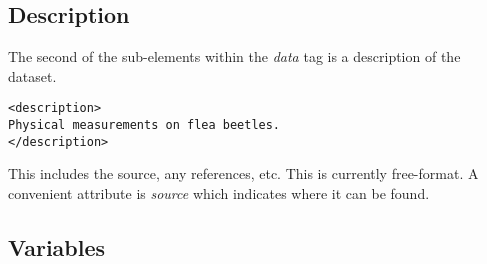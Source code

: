 \documentclass{article}
\def\strip#1>{}
\def\Escape#1{\def\next{#1}%
{\frenchspacing\expandafter\strip\meaning\next}}
\def\file#1{\HREF{#1}{\textbf{\Escape{#1}}}}
\def\XMLTag#1{\textit{#1}}
\def\XMLAttribute#1{\textsl{#1}}
\begin{document}
\begin{comment}
To differentiate between the two formats, the \XMLAttribute{type} is
used when specifying an external color map file to read.  This can be
either \texttt{xml} or \texttt{ascii}.  (See \file{ggobi.dtd})


Each entry can have an identifier attribute.  This is usually an
integer identifying the index by which one can reference this color in
records and other files.  The alternative values for the identifier
attribute are ``fg'' or ``bg''.

The identifier is really only used to override other values read from
a file.  This is due to the fact that subsequent entries without
identifiers occupy the next entry  in the color table.
In other words, the input
\begin{verbatim}
<color id="4" r=".5" g=".5" b="0" />
<color>0 0 1</color>
\end{verbatim}
sets the $5$ entry (in position $4$) to blue ($0 0 1$) since the
previous set entry was indexed explicitly as $4$.


The attribute \XMLAttribute{range} value can be specified for the entire
colormap or on a per-entry basis.  If this is present, it is
interpreted as a numeric value and each value in the entry (or all
entries if specified for the entire colormap) is divided by that
amount.  This allows one to easily use different scales such as 0 to 1
or 0 to 100, etc. This is designed to assist when the software
creating the file does not facilitate such rescaling.
\end{comment}

\subsection{Description}

The second of the sub-elements within the \XMLTag{data} tag is
a description of the dataset.

\begin{verbatim}
<description>
Physical measurements on flea beetles.
</description>
\end{verbatim}

This includes the source, any references, etc.  This is currently
free-format.  A convenient attribute is \XMLAttribute{source} which
indicates where it can be found.

\subsection{Variables}
\end{document}
